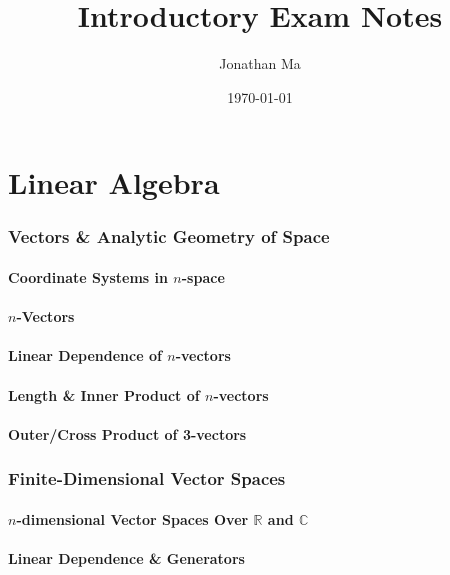 \documentclass[11pt]{article}
\title{\textbf{Introductory Exam Notes}}
\author{Jonathan Ma}
\date{\today}
\newcommand{\R}{\mathbb{R}}
\newcommand{\C}{\mathbb{C}}
\theoremstyle{definition}
\theoremstyle{plain}
\theoremstyle{remark}
\begin{document}
\maketitle

\tableofcontents

\newpage
\part{Linear Algebra}

\section{Vectors \& Analytic Geometry of Space}

\subsection{Coordinate Systems in $n$-space}

\subsection{$n$-Vectors}

\subsection{Linear Dependence of $n$-vectors}

\subsection{Length \& Inner Product of $n$-vectors}

\subsection{Outer/Cross Product of 3-vectors}

\section{Finite-Dimensional Vector Spaces}

\subsection{$n$-dimensional Vector Spaces Over $\R$ and $\C$}

\subsection{Linear Dependence \& Generators}
\end{document}
